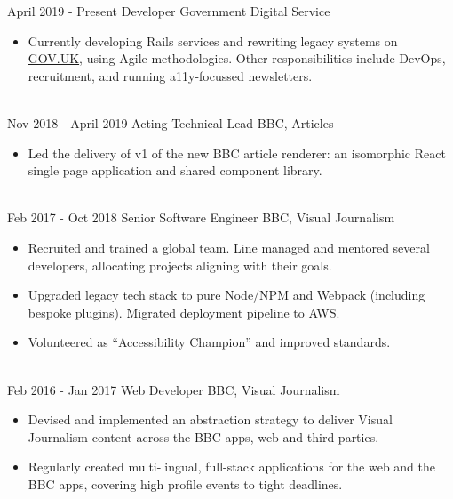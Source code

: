 \documentclass[letterpaper]{twentysecondcv} %
\begin{document}
\begin{twenty} %
    \twentyitem
        {April 2019 -}
		{Present}
        {Developer}
        {Government Digital Service}
        {}
        {
        \begin{itemize}
        \item Currently developing Rails services and rewriting legacy systems on \url{GOV.UK}, using Agile methodologies. Other responsibilities include DevOps, recruitment, and running a11y-focussed newsletters.
        \end{itemize}
        }
    \\
    \twentyitem
        {Nov 2018 -}
		{April 2019}
        {Acting Technical Lead}
        {BBC, Articles}
        {}
        {
        \begin{itemize}
        \item Led the delivery of v1 of the new BBC article renderer: an isomorphic React single page application and shared component library.
        \end{itemize}
    	}
    \\
    \twentyitem
    	{Feb 2017 -}
		{Oct 2018}
        {Senior Software Engineer}
        {BBC, Visual Journalism}
        {}
        {
        \begin{itemize}
        \item Recruited and trained a global team. Line managed and mentored several developers, allocating projects aligning with their goals.
        \item Upgraded legacy tech stack to pure Node/NPM and Webpack (including bespoke plugins). Migrated deployment pipeline to AWS.
        \item Volunteered as ``Accessibility Champion'' and improved standards.
        \end{itemize}
    	}
    \\
	\twentyitem
    	{Feb 2016 -}
		{Jan 2017}
        {Web Developer}
        {BBC, Visual Journalism}
        {}
        {
        {\begin{itemize}
        \item Devised and implemented an abstraction strategy to deliver Visual Journalism content across the BBC apps, web and third-parties.
        \item Regularly created multi-lingual, full-stack applications for the web and the BBC apps, covering high profile events to tight deadlines.
    \end{itemize}}
        }
    \\

\end{twenty}
\end{document}
